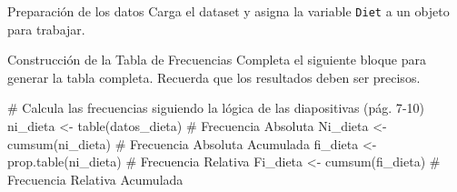 \documentclass[
  ignorenonframetext,
  aspectratio=169,
  spanish,
]{beamer}
\newenvironment{Shaded}{\begin{snugshade}}{\end{snugshade}}
\newcommand{\CommentTok}[1]{\textcolor[rgb]{0.37,0.37,0.37}{#1}}
\newcommand{\FunctionTok}[1]{\textcolor[rgb]{0.28,0.35,0.67}{#1}}
\newcommand{\NormalTok}[1]{\textcolor[rgb]{0.00,0.23,0.31}{#1}}
\newcommand{\OtherTok}[1]{\textcolor[rgb]{0.00,0.23,0.31}{#1}}
\newcommand{\SpecialCharTok}[1]{\textcolor[rgb]{0.37,0.37,0.37}{#1}}
\newcommand{\StringTok}[1]{\textcolor[rgb]{0.13,0.47,0.30}{#1}}
\begin{document}
\begin{frame}[fragile]{Preparación de los datos}
\label{preparaciuxf3n-de-los-datos}
Carga el dataset y asigna la variable \texttt{Diet} a un objeto para
trabajar.

\begin{Shaded}
\end{Shaded}
\end{frame}

\begin{frame}[fragile]{Construcción de la Tabla de Frecuencias}
\label{construcciuxf3n-de-la-tabla-de-frecuencias}
Completa el siguiente bloque para generar la tabla completa. Recuerda
que los resultados deben ser precisos.

\begin{Shaded}
\begin{Highlighting}[]
\CommentTok{\# Calcula las frecuencias siguiendo la lógica de las diapositivas (pág. 7{-}10)}
\NormalTok{ni\_dieta }\OtherTok{\textless{}{-}} \FunctionTok{table}\NormalTok{(datos\_dieta) }\CommentTok{\# Frecuencia Absoluta}
\NormalTok{Ni\_dieta }\OtherTok{\textless{}{-}} \FunctionTok{cumsum}\NormalTok{(ni\_dieta) }\CommentTok{\# Frecuencia Absoluta Acumulada }
\NormalTok{fi\_dieta }\OtherTok{\textless{}{-}} \FunctionTok{prop.table}\NormalTok{(ni\_dieta) }\CommentTok{\# Frecuencia Relativa}
\NormalTok{Fi\_dieta }\OtherTok{\textless{}{-}} \FunctionTok{cumsum}\NormalTok{(fi\_dieta)  }\CommentTok{\# Frecuencia Relativa Acumulada}
\end{Highlighting}
\end{Shaded}
\end{frame}
\end{document}
